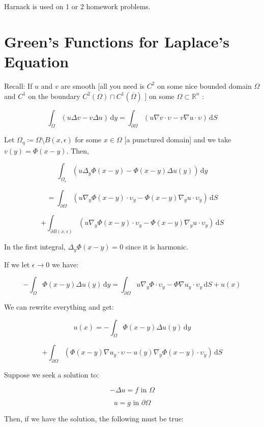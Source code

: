 \documentclass{article}
\theoremstyle{definition}
\begin{document}
Harnack is used on 1 or 2 homework problems.

\section*{Green's Functions for Laplace's Equation}

Recall: If \(u\) and \(v\) are smooth [all you need is \(C^2\) on some nice bounded domain \(\Omega \) and \(C^1\) on the boundary \(C^2(\Omega)\cap C^1(\overline{\Omega} )\) ] on some \(\Omega \subset \mathbb{R} ^n\) :

\[
    \int_{\Omega}^{} (u \Delta v - v \Delta u) \,\mathrm{d}y = \int_{\partial \Omega }^{} (u\nabla v \cdot \upsilon - v \nabla u \cdot \upsilon) \,\mathrm{d}S 
\]

Let \(\Omega _\eta \coloneqq \Omega \setminus B(x,\epsilon)\) for some \(x\in \Omega \) [a punctured domain] and we take \(v(y) = \Phi (x-y)\). Then,

\[
    \int_{\Omega _\epsilon }^{} (u \Delta _y \Phi(x-y) - \Phi(x-y) \Delta u(y)) \,\mathrm{d}y 
\]

\[
    =\int_{\partial \Omega }^{} (u \nabla_y \Phi(x-y)\cdot \upsilon _y - \Phi(x-y)\nabla_y u\cdot \upsilon_y) \,\mathrm{d}S
\]

\[
    + \int_{\partial B(x,\epsilon) }^{} (u \nabla_y \Phi(x-y)\cdot \upsilon _y - \Phi(x-y)\nabla_y u\cdot \upsilon_y) \,\mathrm{d}S 
\]

In the first integral, \(\Delta_y \Phi(x-y) = 0\) since it is harmonic.

If we let \(\epsilon \to 0\) we have:

\[
    -\int_{\Omega }^{} \Phi(x-y)\Delta u(y) \,\mathrm{d}y = \int_{\partial \Omega}^{} u \nabla_y \Phi \cdot \upsilon_y - \Phi \nabla u_y \cdot \upsilon_y \,\mathrm{d}S + u(x)
\]

We can rewrite everything and get:

\[
    u(x) = - \int_{\Omega}^{} \Phi(x-y) \Delta u(y) \,\mathrm{d}y 
\]

\[
    + \int_{\partial \Omega }^{} \left( \Phi(x-y) \nabla u_y \cdot \upsilon - u(y) \nabla_y \Phi(x-y)\cdot \upsilon _y \right)  \,\mathrm{d}S 
\]

Suppose we seek a solution to:

\[
    - \Delta u = f \text{ in } \Omega 
\]

\[
    u = g \text{ in } \partial \Omega 
\]

Then, if we have the solution, the following must be true:
\end{document}
